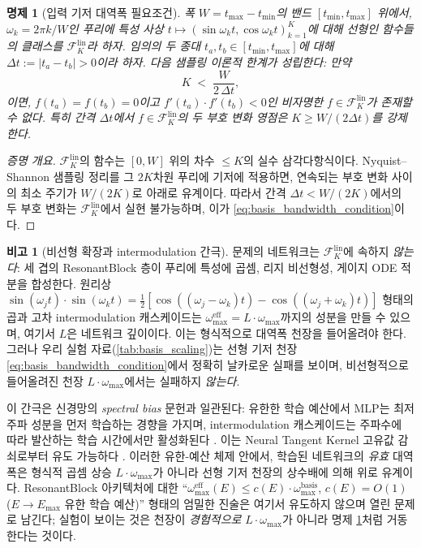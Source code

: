 \documentclass[11pt, a4paper]{article}
\theoremstyle{definition}
\newtheorem{remark}{비고}[section]
\theoremstyle{plain}
\newtheorem{proposition}[theorem]{명제}
\begin{document}
\begin{proposition}[입력 기저 대역폭 필요조건]
\label{prop:basis_bandwidth}
폭 $W=t_{\max}-t_{\min}$의 밴드 $[t_{\min},t_{\max}]$ 위에서, $\omega_k=2\pi k/W$인 푸리에 특성 사상 $t\mapsto(\sin\omega_k t,\cos\omega_k t)_{k=1}^{K}$에 대해 \emph{선형}인 함수들의 클래스를 $\mathcal{F}_K^{\mathrm{lin}}$라 하자. 임의의 두 종대 $t_a,t_b\in[t_{\min},t_{\max}]$에 대해 $\Delta t:=|t_a-t_b|>0$이라 하자. 다음 샘플링 이론적 한계가 성립한다: 만약
\begin{equation}
  K \;<\; \frac{W}{2\,\Delta t},
  \label{eq:basis_bandwidth_condition}
\end{equation}
이면, $f(t_a)=f(t_b)=0$이고 $f'(t_a)\cdot f'(t_b)<0$인 비자명한 $f\in\mathcal{F}_K^{\mathrm{lin}}$가 존재할 수 없다. 특히 간격 $\Delta t$에서 $f\in\mathcal{F}_K^{\mathrm{lin}}$의 두 부호 변화 영점은 $K\geq W/(2\Delta t)$를 강제한다.
\end{proposition}

\begin{proof}[증명 개요]
$\mathcal{F}_K^{\mathrm{lin}}$의 함수는 $[0,W]$ 위의 차수 $\leq K$의 실수 삼각다항식이다. Nyquist--Shannon 샘플링 정리를 그 $2K$차원 푸리에 기저에 적용하면, 연속되는 부호 변화 사이의 최소 주기가 $W/(2K)$로 아래로 유계이다. 따라서 간격 $\Delta t<W/(2K)$에서의 두 부호 변화는 $\mathcal{F}_K^{\mathrm{lin}}$에서 실현 불가능하며, 이가 \eqref{eq:basis_bandwidth_condition}이다.
\end{proof}

\begin{remark}[비선형 확장과 intermodulation 간극]
\label{rem:intermodulation_gap}
문제의 네트워크는 $\mathcal{F}_K^{\mathrm{lin}}$에 속하지 \emph{않는다}: 세 겹의 ResonantBlock 층이 푸리에 특성에 곱셈, 리지 비선형성, 게이지 ODE 적분을 합성한다. 원리상 $\sin(\omega_j t)\cdot\sin(\omega_k t)=\tfrac{1}{2}[\cos((\omega_j-\omega_k)t)-\cos((\omega_j+\omega_k)t)]$ 형태의 곱과 고차 intermodulation 캐스케이드는 $\omega^{\mathrm{eff}}_{\max}=L\cdot\omega_{\max}$까지의 성분을 만들 수 있으며, 여기서 $L$은 네트워크 깊이이다. 이는 형식적으로 대역폭 천장을 들어올려야 한다. 그러나 우리 실험 자료(\cref{tab:basis_scaling})는 선형 기저 천장 \eqref{eq:basis_bandwidth_condition}에서 정확히 날카로운 실패를 보이며, 비선형적으로 들어올려진 천장 $L\cdot\omega_{\max}$에서는 실패하지 \emph{않는다}.

이 간극은 신경망의 \emph{spectral bias} 문헌과 일관된다: 유한한 학습 예산에서 MLP는 최저주파 성분을 먼저 학습하는 경향을 가지며, intermodulation 캐스케이드는 주파수에 따라 발산하는 학습 시간에서만 활성화된다 \cite{Rahaman2019SpectralBias,BasriGeifman2020FrequencyBias}. 이는 Neural Tangent Kernel 고유값 감쇠로부터 유도 가능하다 \cite{Jacot2018NTK}. 이러한 유한-예산 체제 안에서, 학습된 네트워크의 \emph{유효} 대역폭은 형식적 곱셈 상승 $L\cdot\omega_{\max}$가 아니라 선형 기저 천장의 상수배에 의해 위로 유계이다. ResonantBlock 아키텍처에 대한 ``$\omega^{\mathrm{eff}}_{\max}(E)\leq c(E)\cdot\omega^{\mathrm{basis}}_{\max}$, $c(E)=O(1)$ ($E\to E_{\max}$ 유한 학습 예산)'' 형태의 엄밀한 진술은 여기서 유도하지 않으며 열린 문제로 남긴다; 실험이 보이는 것은 천장이 \emph{경험적으로} $L\cdot\omega_{\max}$가 아니라 명제 \ref{prop:basis_bandwidth}처럼 거동한다는 것이다.
\end{remark}
\end{document}

